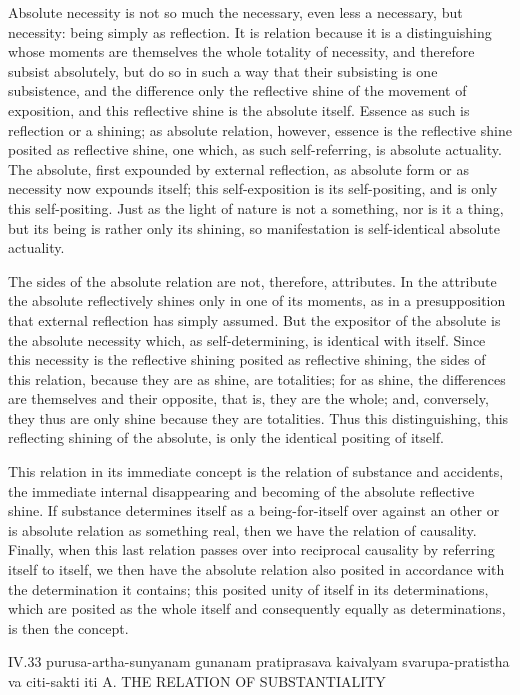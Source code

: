 Absolute necessity is not so much the necessary,
even less a necessary, but necessity:
being simply as reflection.
It is relation because it is a distinguishing
whose moments are themselves
the whole totality of necessity,
and therefore subsist absolutely,
but do so in such a way that
their subsisting is one subsistence,
and the difference only the reflective shine of
the movement of exposition,
and this reflective shine is the absolute itself.
Essence as such is reflection or a shining;
as absolute relation, however, essence is the
reflective shine posited as reflective shine,
one which, as such self-referring, is absolute actuality.
The absolute, first expounded by external reflection,
as absolute form or as necessity now expounds itself;
this self-exposition is its self-positing,
and is only this self-positing.
Just as the light of nature is not a something,
nor is it a thing, but its being is rather only its shining,
so manifestation is self-identical absolute actuality.

The sides of the absolute relation
are not, therefore, attributes.
In the attribute the absolute reflectively shines
only in one of its moments,
as in a presupposition that
external reflection has simply assumed.
But the expositor of the absolute is the absolute necessity
which, as self-determining, is identical with itself.
Since this necessity is the reflective shining
posited as reflective shining, the sides of this relation,
because they are as shine, are totalities;
for as shine, the differences are
themselves and their opposite,
that is, they are the whole;
and, conversely, they thus are only shine
because they are totalities.
Thus this distinguishing,
this reflecting shining of the absolute,
is only the identical positing of itself.

This relation in its immediate concept is
the relation of substance and accidents,
the immediate internal disappearing and becoming
of the absolute reflective shine.
If substance determines itself as a being-for-itself over
against an other or is absolute relation as something real,
then we have the relation of causality.
Finally, when this last relation passes over into
reciprocal causality by referring itself to itself,
we then have the absolute relation also posited
in accordance with the determination it contains;
this posited unity of itself in its determinations,
which are posited as the whole itself
and consequently equally as determinations,
is then the concept.

IV.33
purusa-artha-sunyanam gunanam pratiprasava kaivalyam
svarupa-pratistha va citi-sakti iti
A. THE RELATION OF SUBSTANTIALITY

